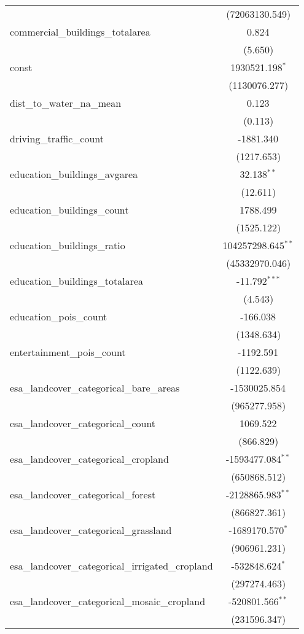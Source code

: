 \begin{table}[!htbp]
\begin{tabular}{@{\extracolsep{5pt}}lc}
  & (72063130.549) \\
 commercial_buildings_totalarea & 0.824$^{}$ \\
  & (5.650) \\
 const & 1930521.198$^{*}$ \\
  & (1130076.277) \\
 dist_to_water_na_mean & 0.123$^{}$ \\
  & (0.113) \\
 driving_traffic_count & -1881.340$^{}$ \\
  & (1217.653) \\
 education_buildings_avgarea & 32.138$^{**}$ \\
  & (12.611) \\
 education_buildings_count & 1788.499$^{}$ \\
  & (1525.122) \\
 education_buildings_ratio & 104257298.645$^{**}$ \\
  & (45332970.046) \\
 education_buildings_totalarea & -11.792$^{***}$ \\
  & (4.543) \\
 education_pois_count & -166.038$^{}$ \\
  & (1348.634) \\
 entertainment_pois_count & -1192.591$^{}$ \\
  & (1122.639) \\
 esa_landcover_categorical_bare_areas & -1530025.854$^{}$ \\
  & (965277.958) \\
 esa_landcover_categorical_count & 1069.522$^{}$ \\
  & (866.829) \\
 esa_landcover_categorical_cropland & -1593477.084$^{**}$ \\
  & (650868.512) \\
 esa_landcover_categorical_forest & -2128865.983$^{**}$ \\
  & (866827.361) \\
 esa_landcover_categorical_grassland & -1689170.570$^{*}$ \\
  & (906961.231) \\
 esa_landcover_categorical_irrigated_cropland & -532848.624$^{*}$ \\
  & (297274.463) \\
 esa_landcover_categorical_mosaic_cropland & -520801.566$^{**}$ \\
  & (231596.347) \\

\end{tabular}
\end{table}
